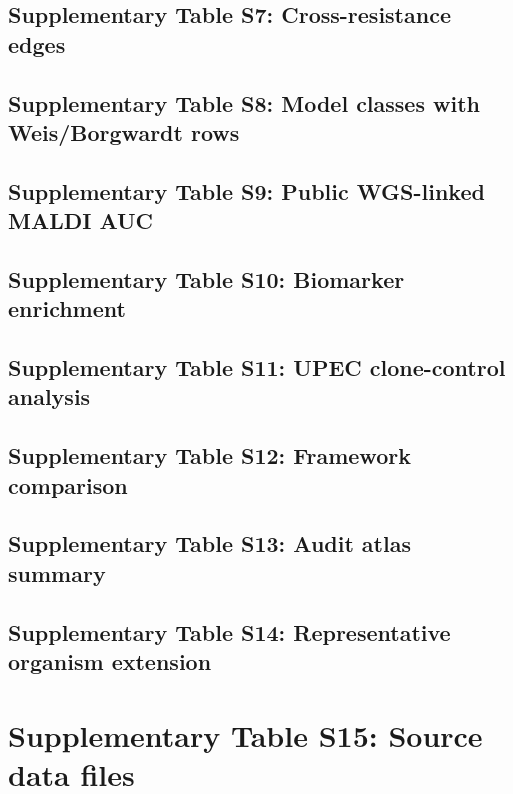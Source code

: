 \documentclass[11pt]{article}
\begin{document}
\subsection*{Supplementary Table S7: Cross-resistance edges}


\subsection*{Supplementary Table S8: Model classes with Weis/Borgwardt rows}


\subsection*{Supplementary Table S9: Public WGS-linked MALDI AUC}


\subsection*{Supplementary Table S10: Biomarker enrichment}


\subsection*{Supplementary Table S11: UPEC clone-control analysis}


\subsection*{Supplementary Table S12: Framework comparison}


\subsection*{Supplementary Table S13: Audit atlas summary}


\subsection*{Supplementary Table S14: Representative organism extension}


\section*{Supplementary Table S15: Source data files}
\end{document}
